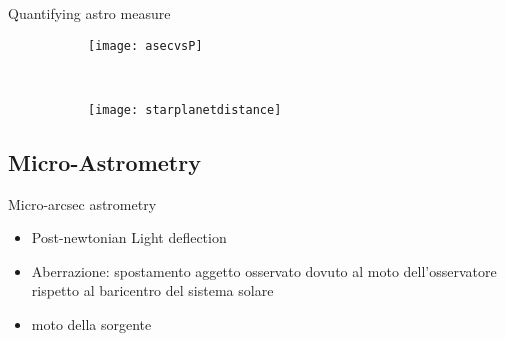 \begin{frame}{Quantifying astro measure}
\begin{figure}[!ht] \begin{subfigure}[b]{0.47\textwidth} \centering \texttt{[image: asecvsP]}
\label{fig:asecvsP}
\end{subfigure}
~
\begin{subfigure}[b]{0.47\textwidth} \centering \texttt{[image: starplanetdistance]}
\end{subfigure}
\end{figure}
\end{frame}

\subsection{Micro-Astrometry}

\begin{frame}{Micro-arcsec astrometry}
\begin{itemize}
\item Post-newtonian Light deflection
\item Aberrazione: spostamento aggetto osservato dovuto al moto dell'osservatore rispetto al baricentro del sistema solare
\item moto della sorgente
\end{itemize}
\end{frame}
